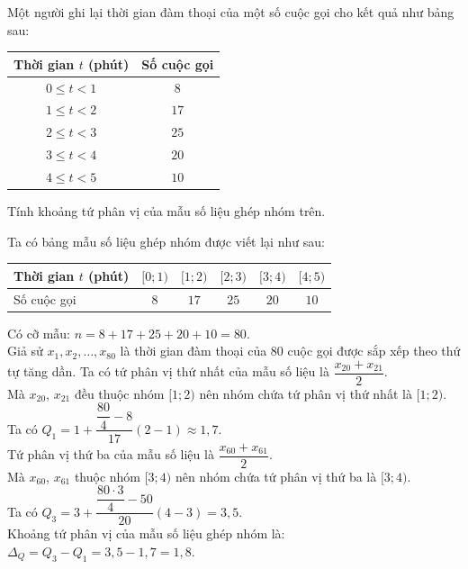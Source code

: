 \begin{ex}%
	Một người ghi lại thời gian đàm thoại của một số cuộc gọi cho kết quả như bảng sau:
	\begin{center}
		\begin{tabular}{|c|c|}
			\hline Thời gian $t$ (phút) & Số cuộc gọi \\
			\hline $0 \leq t<1$ & $8$ \\
			\hline $1 \leq t<2$ & $17$ \\
			\hline $2 \leq t<3$ & $25$ \\
			\hline $3 \leq t<4$ & $20$ \\
			\hline $4 \leq t<5$ & $10$ \\
			\hline
		\end{tabular}
	\end{center}
	Tính khoảng tứ phân vị của mẫu số liệu ghép nhóm trên.
	\loigiai
	{
		Ta có bảng mẫu số liệu ghép nhóm được viết lại như sau:
		\begin{center}
			\begin{tabular}{|l|c|c|c|c|c|}
				\hline 
				Thời gian $t$ (phút) & $[0 ; 1)$ & $[1 ; 2)$ & $[2 ; 3)$ & $[3 ; 4)$ & $[4 ; 5)$ \\
				\hline 
				Số cuộc gọi & $8$ & $17$ & $25$ & $20$ & $10$ \\
				\hline
			\end{tabular}
		\end{center}
		Có cỡ mẫu: $n=8+17+25+20+10=80$.\\
		Giả sử $x_1, x_2, \ldots, x_{80}$ là thời gian đàm thoại của $80$ cuộc gọi được sắp xếp theo thứ tự tăng dần. Ta có tứ phân vị thứ nhất của mẫu số liệu là $\dfrac{x_{20}+x_{21}}{2}$.\\
		Mà $x_{20}$, $x_{21}$ đều thuộc nhóm $[1;2)$ nên nhóm chứa tứ phân vị thứ nhất là $[1;2)$.\\
		Ta có $Q_1=1+\dfrac{\dfrac{80}{4}-8}{17}(2-1) \approx 1{,}7$.\\
		Tứ phân vị thứ ba của mẫu số liệu là $\dfrac{x_{60}+x_{61}}{2}$.\\
		Mà $x_{60}$, $x_{61}$ thuộc nhóm $[3;4)$ nên nhóm chứa tứ phân vị thứ ba là $[3;4)$.\\
		Ta có $Q_3=3+\dfrac{\dfrac{80\cdot 3}{4}-50}{20}(4-3)=3{,}5$.\\
		Khoảng tứ phân vị của mẫu số liệu ghép nhóm là: $\Delta_Q=Q_3-Q_1=3{,}5-1{,}7=1{,}8$.
	}
\end{ex}

